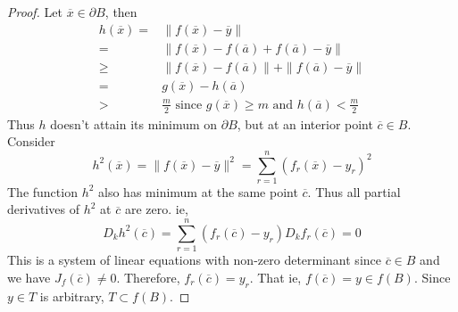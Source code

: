 \begin{proof}
Let $\overline{x} \in \partial B$, then 
\begin{align*}
	h(\overline{x}) = & \| f(\overline{x}) - \overline{y} \| \\
	= &  \| f(\overline{x}) - f(\overline{a}) + f(\overline{a}) - \overline{y} \| \\
	\ge &  \| f(\overline{x}) - f(\overline{a})\| + \| f(\overline{a}) - \overline{y} \| \\ 
	= &  g(\overline{x}) - h(\overline{a}) \\
	> & \frac{m}{2} \text{ since $g(\overline{x}) \ge m$ and $h(\overline{a}) < \frac{m}{2}$}
\end{align*}
	Thus $h$ doesn't attain its minimum on $\partial B$, but at an interior point $\overline{c} \in B$. Consider
	\[ h^2(\overline{x}) = \| f(\overline{x}) - \overline{y}\|^2 = \sum_{r = 1}^n (f_r(\overline{x}) - y_r)^2 \]
	The function $h^2$ also has minimum at the same point $\overline{c}$. Thus all partial derivatives of $h^2$ at $\overline{c}$ are zero. ie, 
	\[ D_k h^2(\overline{c}) = \sum_{r = 1}^n (f_r(\overline{c})-y_r)D_kf_r(\overline{c}) = 0 \]
	This is a system of linear equations with non-zero determinant since $\overline{c} \in B$ and we have $J_f(\overline{c}) \ne 0$. Therefore, $f_r(\overline{c}) = y_r$. That ie, $f(\overline{c}) = y \in f(B)$. Since $y \in T$ is arbitrary, $T \subset f(B)$.
\end{proof}

